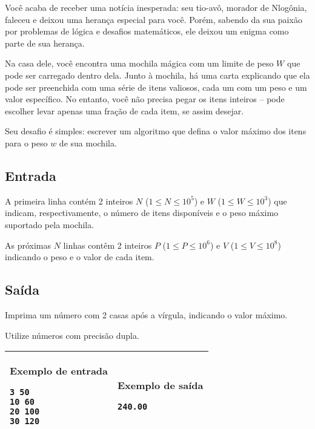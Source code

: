 Você acaba de receber uma notícia inesperada: seu tio-avô, morador de Nlogônia, faleceu e deixou uma herança especial para você. Porém, sabendo da sua paixão por problemas de lógica e desafios matemáticos, ele deixou um enigma como parte de sua herança.

Na casa dele, você encontra uma mochila mágica com um limite de peso $W$ que pode ser carregado dentro dela. Junto à mochila, há uma carta explicando que ela pode ser preenchida com uma série de itens valiosos, cada um com um peso e um valor específico. No entanto, você não precisa pegar os itens inteiros – pode escolher levar apenas uma fração de cada item, se assim desejar.

Seu desafio é simples: escrever um algoritmo que defina o valor máximo dos itens para o peso $w$ de sua mochila.

\subsection*{Entrada}

A primeira linha contém 2 inteiros $N$ ($1 \leq N \leq 10^5$) e $W$ ($1 \leq W \leq 10^3$) que indicam, respectivamente, o número de itens disponíveis e o peso máximo suportado pela mochila.

As próximas $N$ linhas contêm 2 inteiros $P$ ($1 \leq P \leq 10^6$) e $V$ ($1 \leq V \leq 10^8$) indicando o peso e o valor de cada item.

\subsection*{Saída}

Imprima um número com 2 casas após a vírgula, indicando o valor máximo.

Utilize números com precisão dupla.

\begin{table}[!h]
\centering
\begin{tabular}{|l|l|}
\hline
\begin{minipage}[t]{3in}
\textbf{Exemplo de entrada}
\begin{verbatim}
3 50
10 60
20 100
30 120
\end{verbatim}
\vspace{1mm}
\end{minipage}
&
\begin{minipage}[t]{3in}
\textbf{Exemplo de saída}
\begin{verbatim}
240.00
\end{verbatim}
\vspace{1mm}
\end{minipage} \\
\hline
\end{tabular}
\end{table}

